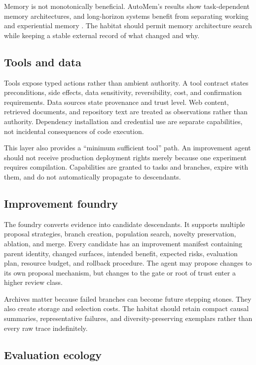 \documentclass[11pt,a4paper]{article}
\begin{document}
Memory is not monotonically beneficial. AutoMem's results show task-dependent memory architectures, and long-horizon systems benefit from separating working and experiential memory \cite{automem,recuris}. The habitat should permit memory architecture search while keeping a stable external record of what changed and why.

\subsection{Tools and data}

Tools expose typed actions rather than ambient authority. A tool contract states preconditions, side effects, data sensitivity, reversibility, cost, and confirmation requirements. Data sources state provenance and trust level. Web content, retrieved documents, and repository text are treated as observations rather than authority. Dependency installation and credential use are separate capabilities, not incidental consequences of code execution.

This layer also provides a ``minimum sufficient tool'' path. An improvement agent should not receive production deployment rights merely because one experiment requires compilation. Capabilities are granted to tasks and branches, expire with them, and do not automatically propagate to descendants.

\subsection{Improvement foundry}

The foundry converts evidence into candidate descendants. It supports multiple proposal strategies, branch creation, population search, novelty preservation, ablation, and merge. Every candidate has an improvement manifest containing parent identity, changed surfaces, intended benefit, expected risks, evaluation plan, resource budget, and rollback procedure. The agent may propose changes to its own proposal mechanism, but changes to the gate or root of trust enter a higher review class.

Archives matter because failed branches can become future stepping stones. They also create storage and selection costs. The habitat should retain compact causal summaries, representative failures, and diversity-preserving exemplars rather than every raw trace indefinitely.

\subsection{Evaluation ecology}
\end{document}
